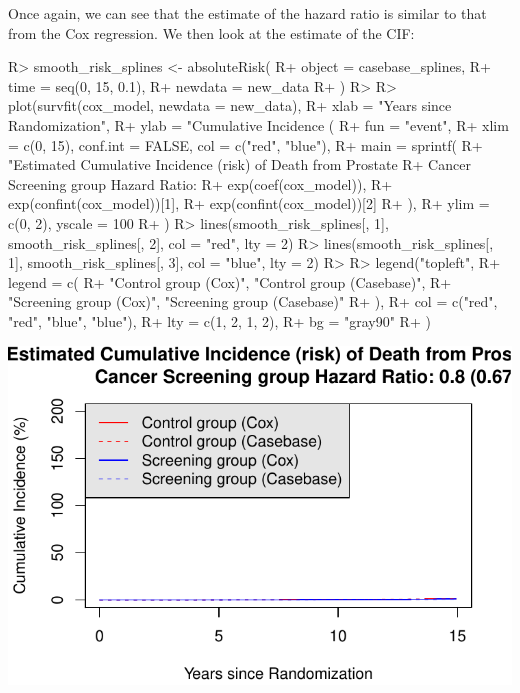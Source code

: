 \documentclass[
]{jss}
\begin{document}
Once again, we can see that the estimate of the hazard ratio is similar
to that from the Cox regression. We then look at the estimate of the
CIF:

\begin{CodeChunk}

\begin{CodeInput}
R> smooth_risk_splines <- absoluteRisk(
R+   object = casebase_splines,
R+   time = seq(0, 15, 0.1),
R+   newdata = new_data
R+ )
R> 
R> plot(survfit(cox_model, newdata = new_data),
R+   xlab = "Years since Randomization",
R+   ylab = "Cumulative Incidence (%
R+   fun = "event",
R+   xlim = c(0, 15), conf.int = FALSE, col = c("red", "blue"),
R+   main = sprintf(
R+     "Estimated Cumulative Incidence (risk) of Death from Prostate 
R+                     Cancer Screening group Hazard Ratio: %
R+     exp(coef(cox_model)),
R+     exp(confint(cox_model))[1],
R+     exp(confint(cox_model))[2]
R+   ),
R+   ylim = c(0, 2), yscale = 100
R+ )
R> lines(smooth_risk_splines[, 1], smooth_risk_splines[, 2], col = "red", lty = 2)
R> lines(smooth_risk_splines[, 1], smooth_risk_splines[, 3], col = "blue", lty = 2)
R> 
R> legend("topleft",
R+   legend = c(
R+     "Control group (Cox)", "Control group (Casebase)",
R+     "Screening group (Cox)", "Screening group (Casebase)"
R+   ),
R+   col = c("red", "red", "blue", "blue"),
R+   lty = c(1, 2, 1, 2),
R+   bg = "gray90"
R+ )
\end{CodeInput}


\begin{center}\includegraphics{../figures/erspc-casebase-splines-cif-1} \end{center}

\end{CodeChunk}
\end{document}
